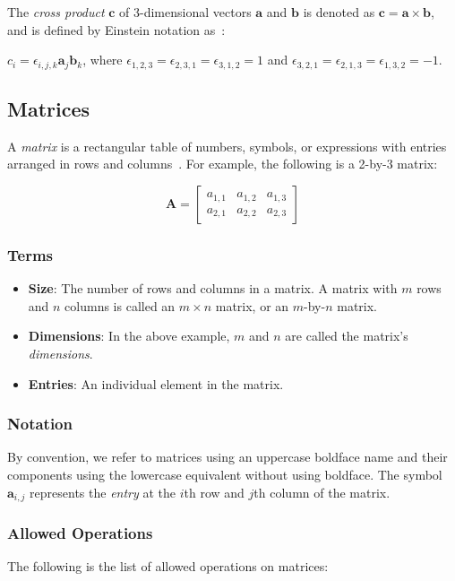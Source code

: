 \documentclass[12pt]{article}
\begin{document}
The \textit{cross product} $\mathbf{c}$ of 3-dimensional vectors $\mathbf{a}$ and
$\mathbf{b}$ is denoted as $\mathbf{c} = \mathbf{a} \times 
\mathbf{b}$, and is defined by Einstein notation as~\citep{ContinuumMechanics2012}:

$c_i = \epsilon_{i,j,k}\mathbf{a}_j\mathbf{b}_k$, where $\epsilon_{1,2,3}=
\epsilon_{2,3,1}=\epsilon_{3,1,2} = 1$ and $\epsilon_{3,2,1} = \epsilon_{2,1,3}
= \epsilon_{1,3,2} = -1$.


\subsection{Matrices}
A \textit{matrix} is a rectangular table of numbers, symbols, or expressions
with entries arranged in rows and columns~\citep{Wikipedia_Matrix_2025}. For
example, the following is a 2-by-3 matrix: 

$$\mathbf{A} = 
\begin{bmatrix}
  a_{1,1} & a_{1,2} & a_{1,3} \\
  a_{2,1} & a_{2,2} & a_{2,3}
 \end{bmatrix}$$

\subsubsection{Terms}

\begin{itemize}
\item \textbf{Size}: The number of rows and columns in a matrix. A matrix with
      $m$ rows and $n$ columns is called an $m \times n$ matrix, or an $m$-by-$n$ matrix.
\item \textbf{Dimensions}: In the above example, $m$ and $n$ are called the matrix's
      \textit{dimensions}.
\item \textbf{Entries}: An individual element in the matrix.
\end{itemize}

\subsubsection{Notation}

By convention, we refer to matrices using an uppercase boldface name and
their components using the lowercase equivalent without using boldface. The
symbol $\mathbf{a}_{i,j}$ represents the \textit{entry} at the $i$th row
and $j$th column of the matrix.

\subsubsection{Allowed Operations}
The following is the list of allowed operations on matrices:
\end{document}
